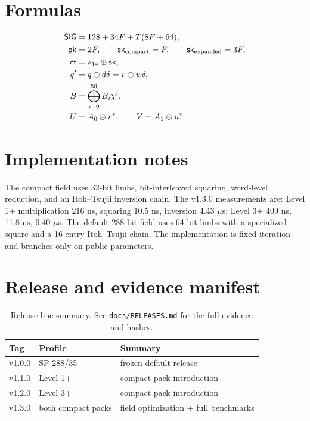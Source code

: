 \documentclass[11pt,a4paper]{article}
\begin{document}
\section{Formulas}

\begin{align}
\mathsf{SIG}&=128+34F+T(8F+64),\\
\mathsf{pk}&=2F,\qquad \mathsf{sk}_{\mathrm{compact}}=F,\qquad
\mathsf{sk}_{\mathrm{expanded}}=3F,\\
\mathsf{ct}&=s_{14}\oplus\mathsf{sk},\\
q'&=q\oplus d\delta=v\oplus w\delta,\\
B&=\bigoplus_{i=0}^{59}B_i\chi^i,\\
U&=A_0\oplus v^\ast,\qquad V=A_1\oplus u^\ast.
\end{align}

\section{Implementation notes}

The compact field uses 32-bit limbs, bit-interleaved squaring, word-level
reduction, and an Itoh--Tsujii inversion chain. The v1.3.0 measurements are:
Level 1+ multiplication 216 ns, squaring 10.5 ns, inversion 4.43 $\mu$s;
Level 3+ 409 ns, 11.8 ns, 9.40 $\mu$s. The default 288-bit field uses 64-bit
limbs with a specialized square and a 16-entry Itoh--Tsujii chain. The
implementation is fixed-iteration and branches only on public parameters.

\section{Release and evidence manifest}

\begin{table}[ht]
\centering
\small
\caption{Release-line summary. See \texttt{docs/RELEASES.md} for the full
evidence and hashes.}
\label{tab:releases}
\begin{tabular}{@{}lll@{}}
\toprule
Tag & Profile & Summary \\
\midrule
v1.0.0 & SP-288/35 & frozen default release \\
v1.1.0 & Level 1+ & compact pack introduction \\
v1.2.0 & Level 3+ & compact pack introduction \\
v1.3.0 & both compact packs & field optimization + full benchmarks \\
\bottomrule
\end{tabular}
\end{table}
\end{document}
